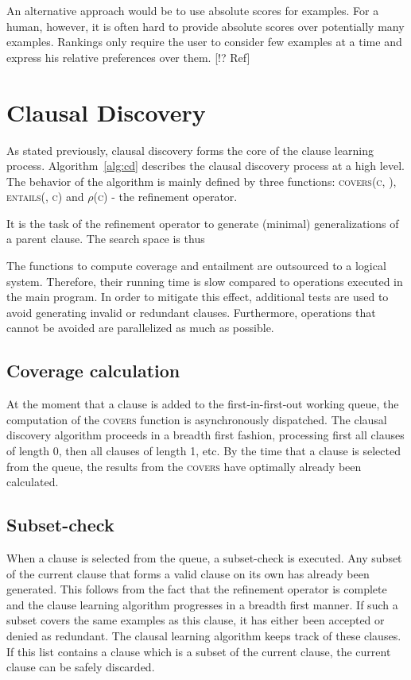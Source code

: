 An alternative approach would be to use absolute scores for examples. For a human, however, it is often hard to provide absolute scores over potentially many examples. Rankings only require the user to consider few examples at a time and express his relative preferences over them. [!? Ref]

\section{Clausal Discovery}
As stated previously, clausal discovery forms the core of the clause learning process. Algorithm~\ref{alg:cd} describes the clausal discovery process at a high level. The behavior of the algorithm is mainly defined by three functions: \textsc{covers(c, )}, \textsc{entails(, c)} and \textsc{$\rho$(c)} - the refinement operator. 

It is the task of the refinement operator to generate (minimal) generalizations of a parent clause. The search space is thus 

The functions to compute coverage and entailment are outsourced to a logical system. Therefore, their running time is slow compared to operations executed in the main program. In order to mitigate this effect, additional tests are used to avoid generating invalid or redundant clauses. Furthermore, operations that cannot be avoided are parallelized as much as possible.

\subsection{Coverage calculation}
At the moment that a clause is added to the first-in-first-out working queue, the computation of the \textsc{covers} function is asynchronously dispatched. The clausal discovery algorithm proceeds in a breadth first fashion, processing first all clauses of length 0, then all clauses of length 1, etc. By the time that a clause is selected from the queue, the results from the \textsc{covers} have optimally already been calculated.

\subsection{Subset-check}
When a clause is selected from the queue, a subset-check is executed. Any subset of the current clause that forms a valid clause on its own has already been generated. This follows from the fact that the refinement operator is complete and the clause learning algorithm progresses in a breadth first manner. If such a subset covers the same examples as this clause, it has either been accepted or denied as redundant. The clausal learning algorithm keeps track of these clauses. If this list contains a clause which is a subset of the current clause, the current clause can be safely discarded.

